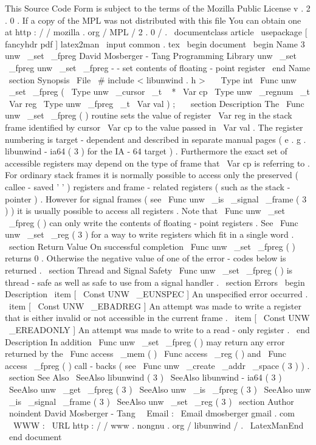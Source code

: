 %
This
Source
Code
Form
is
subject
to
the
terms
of
the
Mozilla
Public
%
License
v
.
2
.
0
.
If
a
copy
of
the
MPL
was
not
distributed
with
this
%
file
You
can
obtain
one
at
http
:
/
/
mozilla
.
org
/
MPL
/
2
.
0
/
.
\
documentclass
{
article
}
\
usepackage
[
fancyhdr
pdf
]
{
latex2man
}
\
input
{
common
.
tex
}
\
begin
{
document
}
\
begin
{
Name
}
{
3
}
{
unw
\
_set
\
_fpreg
}
{
David
Mosberger
-
Tang
}
{
Programming
Library
}
{
unw
\
_set
\
_fpreg
}
unw
\
_set
\
_fpreg
-
-
set
contents
of
floating
-
point
register
\
end
{
Name
}
\
section
{
Synopsis
}
\
File
{
\
#
include
<
libunwind
.
h
>
}
\
\
\
Type
{
int
}
\
Func
{
unw
\
_set
\
_fpreg
}
(
\
Type
{
unw
\
_cursor
\
_t
~
*
}
\
Var
{
cp
}
\
Type
{
unw
\
_regnum
\
_t
}
\
Var
{
reg
}
\
Type
{
unw
\
_fpreg
\
_t
}
\
Var
{
val
}
)
;
\
\
\
section
{
Description
}
The
\
Func
{
unw
\
_set
\
_fpreg
}
(
)
routine
sets
the
value
of
register
\
Var
{
reg
}
in
the
stack
frame
identified
by
cursor
\
Var
{
cp
}
to
the
value
passed
in
\
Var
{
val
}
.
The
register
numbering
is
target
-
dependent
and
described
in
separate
manual
pages
(
e
.
g
.
libunwind
-
ia64
(
3
)
for
the
IA
-
64
target
)
.
Furthermore
the
exact
set
of
accessible
registers
may
depend
on
the
type
of
frame
that
\
Var
{
cp
}
is
referring
to
.
For
ordinary
stack
frames
it
is
normally
possible
to
access
only
the
preserved
(
callee
-
saved
'
'
)
registers
and
frame
-
related
registers
(
such
as
the
stack
-
pointer
)
.
However
for
signal
frames
(
see
\
Func
{
unw
\
_is
\
_signal
\
_frame
}
(
3
)
)
it
is
usually
possible
to
access
all
registers
.
Note
that
\
Func
{
unw
\
_set
\
_fpreg
}
(
)
can
only
write
the
contents
of
floating
-
point
registers
.
See
\
Func
{
unw
\
_set
\
_reg
}
(
3
)
for
a
way
to
write
registers
which
fit
in
a
single
word
.
\
section
{
Return
Value
}
On
successful
completion
\
Func
{
unw
\
_set
\
_fpreg
}
(
)
returns
0
.
Otherwise
the
negative
value
of
one
of
the
error
-
codes
below
is
returned
.
\
section
{
Thread
and
Signal
Safety
}
\
Func
{
unw
\
_set
\
_fpreg
}
(
)
is
thread
-
safe
as
well
as
safe
to
use
from
a
signal
handler
.
\
section
{
Errors
}
\
begin
{
Description
}
\
item
[
\
Const
{
UNW
\
_EUNSPEC
}
]
An
unspecified
error
occurred
.
\
item
[
\
Const
{
UNW
\
_EBADREG
}
]
An
attempt
was
made
to
write
a
register
that
is
either
invalid
or
not
accessible
in
the
current
frame
.
\
item
[
\
Const
{
UNW
\
_EREADONLY
}
]
An
attempt
was
made
to
write
to
a
read
-
only
register
.
\
end
{
Description
}
In
addition
\
Func
{
unw
\
_set
\
_fpreg
}
(
)
may
return
any
error
returned
by
the
\
Func
{
access
\
_mem
}
(
)
\
Func
{
access
\
_reg
}
(
)
and
\
Func
{
access
\
_fpreg
}
(
)
call
-
backs
(
see
\
Func
{
unw
\
_create
\
_addr
\
_space
}
(
3
)
)
.
\
section
{
See
Also
}
\
SeeAlso
{
libunwind
(
3
)
}
\
SeeAlso
{
libunwind
-
ia64
(
3
)
}
\
SeeAlso
{
unw
\
_get
\
_fpreg
(
3
)
}
\
SeeAlso
{
unw
\
_is
\
_fpreg
(
3
)
}
\
SeeAlso
{
unw
\
_is
\
_signal
\
_frame
(
3
)
}
\
SeeAlso
{
unw
\
_set
\
_reg
(
3
)
}
\
section
{
Author
}
\
noindent
David
Mosberger
-
Tang
\
\
Email
:
\
Email
{
dmosberger
gmail
.
com
}
\
\
WWW
:
\
URL
{
http
:
/
/
www
.
nongnu
.
org
/
libunwind
/
}
.
\
LatexManEnd
\
end
{
document
}
